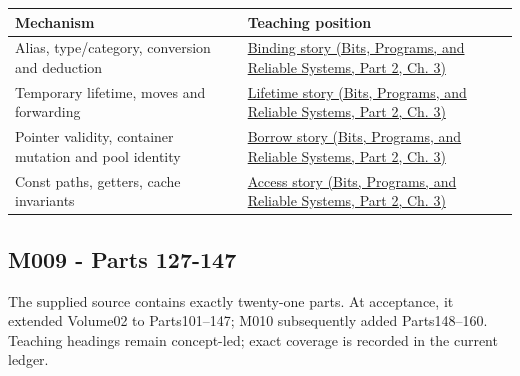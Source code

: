 {\def\LTcaptype{none} %
\begin{longtable}[]{@{}
  >{\raggedright\arraybackslash}p{}
  >{\raggedright\arraybackslash}p{}@{}}
\toprule\noalign{}
\begin{minipage}[b]{\linewidth}\raggedright
Mechanism
\end{minipage} & \begin{minipage}[b]{\linewidth}\raggedright
Teaching position
\end{minipage} \\
\midrule\noalign{}
\endhead
\bottomrule\noalign{}
\endlastfoot
Alias, type/category, conversion and deduction & \href{../01-Bits-Programs-and-Reliable-Systems-P02/main.pdf\#nameddest=01-foundations-i-ch003-giving-another-name-to-a-live-object}{Binding story (Bits, Programs, and Reliable Systems, Part 2, Ch. 3)} \\
Temporary lifetime, moves and forwarding & \href{../01-Bits-Programs-and-Reliable-Systems-P02/main.pdf\#nameddest=01-foundations-i-ch003-a-temporary-needs-an-explicit-lifetime-story}{Lifetime story (Bits, Programs, and Reliable Systems, Part 2, Ch. 3)} \\
Pointer validity, container mutation and pool identity & \href{../01-Bits-Programs-and-Reliable-Systems-P02/main.pdf\#nameddest=01-foundations-i-ch003-when-a-valid-borrow-stops-naming-the-intended-thing}{Borrow story (Bits, Programs, and Reliable Systems, Part 2, Ch. 3)} \\
Const paths, getters, cache invariants & \href{../01-Bits-Programs-and-Reliable-Systems-P02/main.pdf\#nameddest=01-foundations-i-ch003-read-only-is-a-path-not-an-ownership-or-synchronization-promise}{Access story (Bits, Programs, and Reliable Systems, Part 2, Ch. 3)} \\
\end{longtable}
}

\subsection{M009 - Parts 127-147}\label{appendix-fd090d982a15-m009---parts-127-147}

\hypertarget{appendix-fd090d982a15-m009---parts-127-147}{}

The supplied source contains exactly twenty-one parts. At acceptance, it extended Volume02 to Parts101--147; M010 subsequently added Parts148--160. Teaching headings remain concept-led; exact coverage is recorded in the current ledger.

